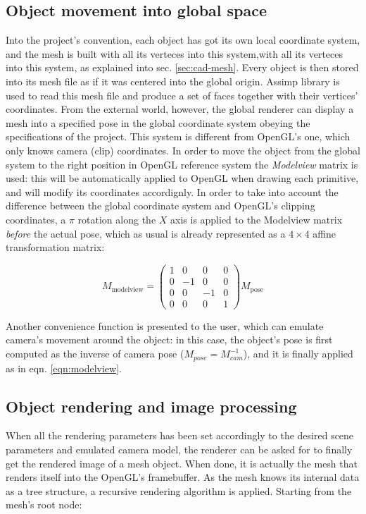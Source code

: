 \subsection{Object movement into global space}
Into the project's convention, each object has got its own local coordinate
system, and the mesh is built with all its verteces into this system,with all
its verteces into this system,  as explained into sec. \ref{sec:cad-mesh}. Every
object is then stored into its mesh file as if it was centered into the global
origin. Assimp library is used to read this mesh file and produce a set of faces
together with their vertices' coordinates. From the external world, however, the global
renderer can display a mesh into a specified pose in the global coordinate
system obeying the specifications of the project. This system is different from
OpenGL's one, which only knows camera (clip) coordinates. In order to move
the object from the global system to the right position in OpenGL reference
system the \emph{Modelview} matrix is used: this will be automatically applied
to OpenGL when drawing each primitive, and will modify its coordinates
accordignly. In order to take into account the difference between the global
coordinate system and OpenGL's clipping coordinates, a $\pi$ rotation along the
$X$ axis is applied
to the Modelview matrix \emph{before} the actual pose, which as usual is
already represented as a $4 \times 4$ affine transformation matrix:

\begin{equation} \label{eqn:modelview}
  M_{\text{modelview}} = 
  \begin{pmatrix}
    1 & 0 & 0 & 0 \\
    0 & -1 & 0 & 0 \\
    0 & 0 & -1 & 0 \\
    0 & 0 & 0 & 1 
  \end{pmatrix} M_{\text{pose}}
\end{equation}

Another convenience function is presented to the user, which can emulate
camera's movement around the object: in this case, the object's pose is first
computed as the inverse of camera pose ($M_{pose}=M_{cam}^{-1}$), and it is
finally applied as in eqn. \ref{eqn:modelview}.

\subsection{Object rendering and image processing} \label{sec:meshdraw}
When all the rendering parameters has been set accordingly to the desired scene
parameters and emulated camera model, the renderer can be asked for to finally
get the rendered image of a mesh object. When done, it is actually the mesh that
renders itself into the OpenGL's framebuffer. As the mesh knows its internal
data as a tree structure, a recursive rendering algorithm is applied. Starting
from the mesh's root node:

